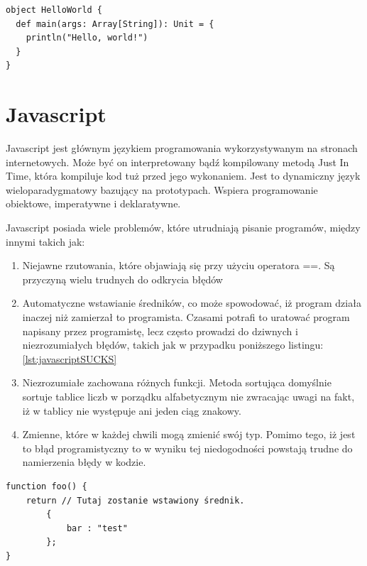 \begin{lstlisting}[frame=single, numbers=none,captionpos=b, 
caption={Hello world napisany w języku Scala.}]
object HelloWorld {
  def main(args: Array[String]): Unit = {
    println("Hello, world!")
  }
}
\end{lstlisting}

\section{Javascript}

Javascript jest głównym językiem programowania wykorzystywanym na stronach internetowych. Może być on interpretowany bądź kompilowany metodą Just In Time, która kompiluje kod tuż przed jego wykonaniem. Jest to dynamiczny język wieloparadygmatowy bazujący na prototypach. Wspiera programowanie obiektowe, imperatywne i deklaratywne.\cite{AboutJS}

Javascript posiada wiele problemów, które utrudniają pisanie programów, między innymi takich jak:
\begin{enumerate}
	\item Niejawne rzutowania, które objawiają się przy użyciu operatora ==. Są przyczyną wielu trudnych do odkrycia błędów
	\item Automatyczne wstawianie średników, co może spowodować, iż program działa inaczej niż zamierzał to programista. Czasami potrafi to uratować program napisany przez programistę, lecz często prowadzi do dziwnych i niezrozumiałych błędów, takich jak w przypadku poniższego listingu: \ref{lst:javascriptSUCKS}
	\item Niezrozumiałe zachowana różnych funkcji. Metoda sortująca domyślnie sortuje tablice liczb w porządku alfabetycznym nie zwracając uwagi na fakt, iż w tablicy nie występuje ani jeden ciąg znakowy.
	\item Zmienne, które w każdej chwili mogą zmienić swój typ. Pomimo tego, iż jest to błąd programistyczny to w wyniku tej niedogodności powstają trudne do namierzenia błędy w kodzie.
\end{enumerate}

\begin{lstlisting}[label={lst:javascriptSUCKS},
frame=single, numbers=none,captionpos=b, 
caption={Przykład niepoprawnego kodu Javascript wynikłego z automatycznego wstawienia średnika}]
function foo() {
    return // Tutaj zostanie wstawiony średnik.
        {
            bar : "test"
        };
}
\end{lstlisting}


